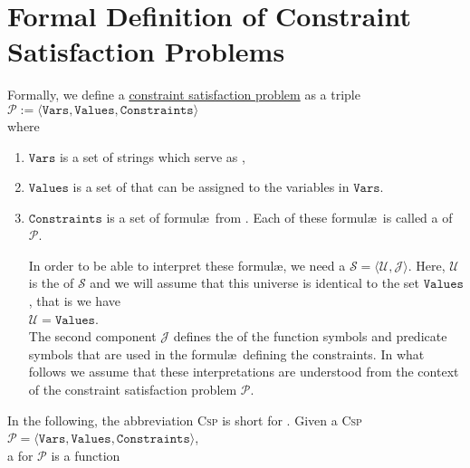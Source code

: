 \section{Formal Definition of Constraint Satisfaction Problems}
Formally, we define a 
\href{https://en.wikipedia.org/wiki/Constraint_satisfaction_problem}{constraint satisfaction problem} as a triple
\\[0.2cm]
\hspace*{1.3cm}
$\mathcal{P} := \langle \mathtt{Vars}, \mathtt{Values}, \mathtt{Constraints} \rangle$
\\[0.2cm]
where
\begin{enumerate}
\item $\mathtt{Vars}$ is a set of strings which serve as ,
\item $\mathtt{Values}$ is a set of  that can be assigned to the variables in $\mathtt{Vars}$.
\item $\mathtt{Constraints}$ is a set of formul\ae\ from .  Each of these formul\ae\ is
      called a  of $\mathcal{P}$.

      In order to be able to interpret these formul\ae, we need a  $\mathcal{S} = \langle \mathcal{U}, \mathcal{J} \rangle$.  
      Here, $\mathcal{U}$ is the  of $\mathcal{S}$ and we will assume that this
      universe is identical to the set $\mathtt{Values}$, that is we have
      \\[0.2cm]
      \hspace*{1.3cm}
      $\mathcal{U} = \texttt{Values}$.
      \\[0.2cm]
      The second component $\mathcal{J}$ defines the
       of the function symbols and predicate symbols that are used in the formul\ae\
      defining the constraints.  In what follows we assume that these interpretations are understood from the
      context of the constraint satisfaction problem $\mathcal{P}$.
\end{enumerate}
In the following, the abbreviation \textsc{Csp} is short for .
Given a \textsc{Csp}
\\[0.2cm]
\hspace*{1.3cm}
 $\mathcal{P} = \langle \mathtt{Vars}, \mathtt{Values}, \mathtt{Constraints} \rangle$, 
\\[0.2cm]
a  for $\mathcal{P}$ is a function
\\[0.2cm]
\hspace*{1.3cm}
